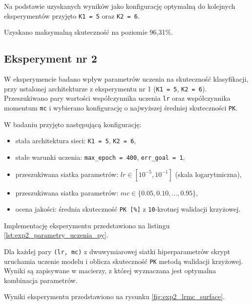 \documentclass[12pt,twoside]{article}
\begin{document}
Na podstawie uzyskanych wyników jako konfigurację optymalną do kolejnych eksperymentów
przyjęto \texttt{K1 = 5} oraz \texttt{K2 = 6}.

Uzyskano maksymalną skuteczność na poziomie 96,31\%.

\subsection{Eksperyment nr 2}

W eksperymencie badano wpływ parametrów uczenia na skuteczność klasyfikacji,
przy ustalonej architekturze z eksperymentu nr 1 (\texttt{K1 = 5}, \texttt{K2 = 6}).
Przeszukiwano pary wartości współczynnika uczenia \texttt{lr} oraz współczynnika momentum \texttt{mc}
i wybierano konfigurację o najwyższej średniej skuteczności \texttt{PK}.

W badaniu przyjęto następującą konfigurację:
\begin{itemize}[label={\textbullet}]
\item stała architektura sieci: \texttt{K1 = 5}, \texttt{K2 = 6},
\item stałe warunki uczenia: \texttt{max\_epoch = 400}, \texttt{err\_goal = 1},
\item przeszukiwana siatka parametrów: $lr \in [10^{-5}, 10^{-1}]$ (skala logarytmiczna),
\item przeszukiwana siatka parametrów: $mc \in \{0.05, 0.10, \ldots, 0.95\}$,
\item ocena jakości: średnia skuteczność \texttt{PK [\%]} z \texttt{10}-krotnej walidacji krzyżowej.
\end{itemize}

Implementację eksperymentu przedstawiono na listingu \ref{lst:exp2_parametry_uczenia_py}.



Dla każdej pary \texttt{(lr, mc)} z dwuwymiarowej siatki hiperparametrów skrypt uruchamia uczenie modelu i oblicza skuteczność \texttt{PK} metodą walidacji krzyżowej. Wyniki są zapisywane w macierzy, z której wyznaczana jest optymalna kombinacja parametrów.

Wyniki eksperymentu przedstawiono na rysunku \ref{fig:exp2_lrmc_surface}.
\end{document}
